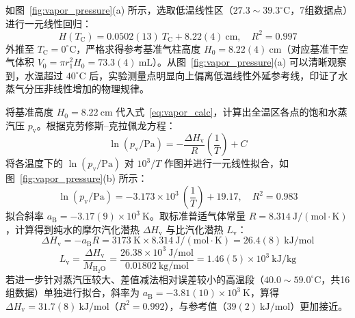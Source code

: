 \documentclass[10pt, a4paper]{ctexart}
\begin{document}
如图~\ref{fig:vapor_pressure}(a) 所示，选取低温线性区（$27.3\sim 39.3^\circ\mathrm{C}$，7组数据点）进行一元线性回归：
\begin{equation}
H(T_{\mathrm{C}}) = 0.0502(13)\ T_{\mathrm{C}} + 8.22(4)\ \mathrm{cm}, \quad R^2 = 0.997
\end{equation}
外推至 $T_{\mathrm{C}} = 0^\circ\mathrm{C}$，严格求得参考基准气柱高度 $H_0 = 8.22(4)\ \mathrm{cm}$（对应基准干空气体积 $V_0 = \pi r_1^2 H_0 = 73.3(4)\ \mathrm{mL}$）。从图~\ref{fig:vapor_pressure}(a) 可以清晰观察到，水温超过 $40^\circ\mathrm{C}$ 后，实验测量点明显向上偏离低温线性外延参考线，印证了水蒸气分压非线性增加的物理规律。

将基准高度 $H_0 = 8.22\ \mathrm{cm}$ 代入式~\eqref{eq:vapor_calc}，计算出全温区各点的饱和水蒸汽压 $p_{\mathrm{v}}$。根据克劳修斯--克拉佩龙方程\cite{ref6, ref7}：
\begin{equation}
\ln(p_{\mathrm{v}}/\mathrm{Pa}) = -\frac{\Delta H_{\mathrm{v}}}{R}\left(\frac{1}{T}\right) + C
\label{eq:clausius}
\end{equation}
将各温度下的 $\ln(p_{\mathrm{v}}/\mathrm{Pa})$ 对 $10^3/T$ 作图并进行一元线性拟合，如图~\ref{fig:vapor_pressure}(b) 所示：
\begin{equation}
\ln(p_{\mathrm{v}}/\mathrm{Pa}) = -3.173\times 10^3\ \left(\frac{1}{T}\right) + 19.17, \quad R^2 = 0.983
\end{equation}
拟合斜率 $a_{\mathrm{B}} = -3.17(9)\times 10^3\ \mathrm{K}$。取标准普适气体常量 $R = 8.314\ \mathrm{J/(mol\cdot K)}$，计算得到纯水的摩尔汽化潜热 $\Delta H_{\mathrm{v}}$ 与比汽化潜热 $L_{\mathrm{v}}$：
\begin{equation}
\Delta H_{\mathrm{v}} = -a_{\mathrm{B}} R = 3173\ \mathrm{K} \times 8.314\ \mathrm{J/(mol\cdot K)} = 26.4(8)\ \mathrm{kJ/mol}
\end{equation}
\begin{equation}
L_{\mathrm{v}} = \frac{\Delta H_{\mathrm{v}}}{M_{\mathrm{H_2O}}} = \frac{26.38\times 10^3\ \mathrm{J/mol}}{0.01802\ \mathrm{kg/mol}} = 1.46(5)\times 10^3\ \mathrm{kJ/kg}
\end{equation}
若进一步针对蒸汽压较大、差值减法相对误差较小的高温段（$40.0\sim 59.0^\circ\mathrm{C}$，共16组数据）单独进行拟合，斜率为 $a_{\mathrm{B}} = -3.81(10)\times 10^3\ \mathrm{K}$，算得 $\Delta H_{\mathrm{v}} = 31.7(8)\ \mathrm{kJ/mol}$（$R^2 = 0.992$），与参考值（$39(2)\ \mathrm{kJ/mol}$）更加接近。
\end{document}
